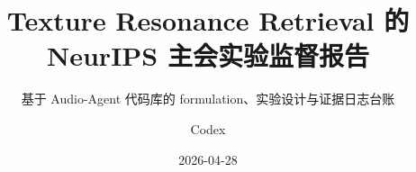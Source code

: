 \documentclass[UTF8,11pt]{ctexrep}
\title{Texture Resonance Retrieval 的 NeurIPS 主会实验监督报告}
\subtitle{基于 Audio-Agent 代码库的 formulation、实验设计与证据日志台账}
\author{Codex}
\date{2026-04-28}
\begin{document}
\makecustomtitle
\tableofcontents
\clearpage

\end{document}
